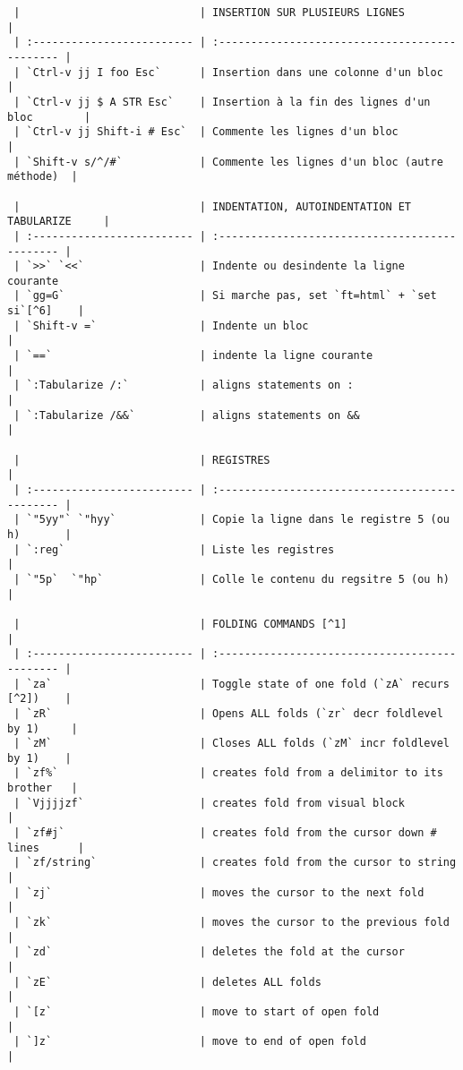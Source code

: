 \documentclass[10pt,landscape]{article}
\begin{document}
\begin{multicols}{2}
\begin{verbatim}
 |                            | INSERTION SUR PLUSIEURS LIGNES                 |
 | :------------------------- | :--------------------------------------------- |
 | `Ctrl-v jj I foo Esc`      | Insertion dans une colonne d'un bloc           |
 | `Ctrl-v jj $ A STR Esc`    | Insertion à la fin des lignes d'un bloc        |
 | `Ctrl-v jj Shift-i # Esc`  | Commente les lignes d'un bloc                  |
 | `Shift-v s/^/#`            | Commente les lignes d'un bloc (autre méthode)  |

 |                            | INDENTATION, AUTOINDENTATION ET TABULARIZE     |
 | :------------------------- | :--------------------------------------------- |
 | `>>` `<<`                  | Indente ou desindente la ligne courante
 | `gg=G`                     | Si marche pas, set `ft=html` + `set si`[^6]    |
 | `Shift-v =`                | Indente un bloc                                |
 | `==`                       | indente la ligne courante                      |
 | `:Tabularize /:`           | aligns statements on :                         |
 | `:Tabularize /&&`          | aligns statements on &&                        |

 |                            | REGISTRES                                      |
 | :------------------------- | :--------------------------------------------- |
 | `"5yy"` `"hyy`             | Copie la ligne dans le registre 5 (ou h)       |
 | `:reg`                     | Liste les registres                            |
 | `"5p`  `"hp`               | Colle le contenu du regsitre 5 (ou h)          |

 |                            | FOLDING COMMANDS [^1]                          |
 | :------------------------- | :--------------------------------------------- |
 | `za`                       | Toggle state of one fold (`zA` recurs [^2])    |
 | `zR`                       | Opens ALL folds (`zr` decr foldlevel by 1)     |
 | `zM`                       | Closes ALL folds (`zM` incr foldlevel by 1)    |
 | `zf%`                      | creates fold from a delimitor to its brother   |
 | `Vjjjjzf`                  | creates fold from visual block                 |
 | `zf#j`                     | creates fold from the cursor down # lines      |
 | `zf/string`                | creates fold from the cursor to string         |
 | `zj`                       | moves the cursor to the next fold              |
 | `zk`                       | moves the cursor to the previous fold          |
 | `zd`                       | deletes the fold at the cursor                 |
 | `zE`                       | deletes ALL folds                              |
 | `[z`                       | move to start of open fold                     |
 | `]z`                       | move to end of open fold                       |


\end{verbatim}
\end{multicols}
\end{document}
